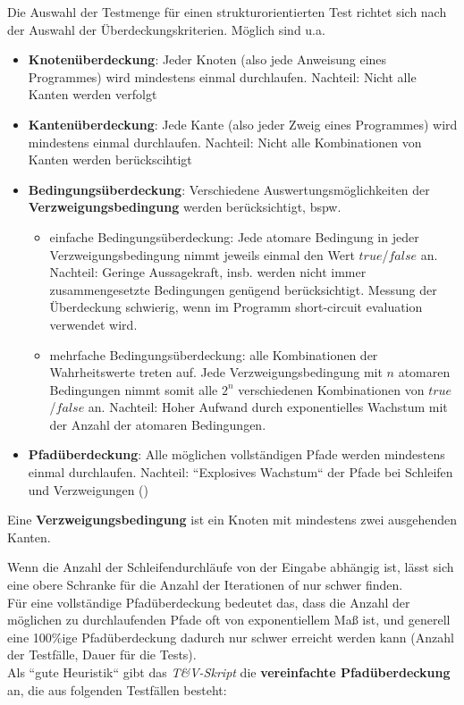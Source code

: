 \noindent
Die Auswahl der Testmenge für einen strukturorientierten Test richtet sich nach der Auswahl der Überdeckungskriterien.
Möglich sind u.a.

\begin{itemize}
    \item \textbf{Knotenüberdeckung}: Jeder Knoten (also jede Anweisung eines Programmes) wird mindestens einmal durchlaufen. Nachteil: Nicht alle Kanten werden verfolgt
    \item \textbf{Kantenüberdeckung}: Jede Kante (also jeder Zweig eines Programmes) wird mindestens einmal durchlaufen. Nachteil: Nicht alle Kombinationen von Kanten werden berückscihtigt
    \item \textbf{Bedingungsüberdeckung}: Verschiedene Auswertungsmöglichkeiten der \textbf{Verzweigungsbedingung} werden berücksichtigt, bspw.
    \begin{itemize}
        \item einfache Bedingungsüberdeckung: Jede atomare Bedingung in jeder Verzweigungsbedingung nimmt jeweils einmal den Wert $true$/$false$ an. Nachteil: Geringe Aussagekraft, insb. werden nicht immer zusammengesetzte Bedingungen genügend berücksichtigt. Messung der Überdeckung schwierig, wenn im Programm short-circuit evaluation verwendet wird.
        \item mehrfache Bedingungsüberdeckung: alle Kombinationen der Wahrheitswerte treten auf. Jede Verzweigungsbedingung mit $n$ atomaren Bedingungen nimmt somit alle $2^n$ verschiedenen Kombinationen von $true$/$false$ an. Nachteil: Hoher Aufwand durch exponentielles Wachstum mit der Anzahl der atomaren Bedingungen.
    \end{itemize}
    \item \textbf{Pfadüberdeckung}: Alle möglichen vollständigen Pfade werden mindestens einmal durchlaufen. Nachteil: ``Explosives Wachstum`` der Pfade bei Schleifen und Verzweigungen (\cite[406]{Bal97})
\end{itemize}

\vspace{5mm}
\begin{tcolorbox}[title={Verzweigungsbedingung}]
    Eine \textbf{Verzweigungsbedingung} ist ein Knoten mit mindestens zwei ausgehenden Kanten.
\end{tcolorbox}
\vspace{5mm}

\noindent
Wenn die Anzahl der Schleifendurchläufe von der Eingabe abhängig ist, lässt sich eine obere Schranke für die Anzahl der Iterationen of nur schwer finden.\\
Für eine vollständige Pfadüberdeckung bedeutet das, dass die Anzahl der möglichen zu durchlaufenden Pfade oft von exponentiellem Maß ist, und generell eine 100\%ige Pfadüberdeckung dadurch nur schwer erreicht werden kann (Anzahl der Testfälle, Dauer für die Tests).\\
Als ``gute Heuristik`` gibt das \textit{T\&V-Skript} die \textbf{vereinfachte Pfadüberdeckung} an, die aus folgenden Testfällen besteht:

